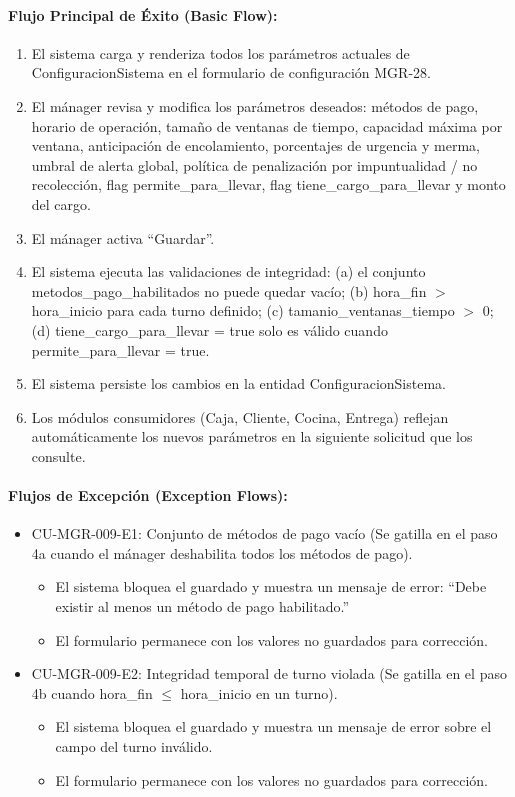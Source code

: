\paragraph{Flujo Principal de Éxito (Basic Flow):}
\begin{enumerate}
    \item[I.] El sistema carga y renderiza todos los parámetros actuales de ConfiguracionSistema en el formulario de configuración MGR-28.
    \item[II.] El mánager revisa y modifica los parámetros deseados: métodos de pago, horario de operación, tamaño de ventanas de tiempo, capacidad máxima por ventana, anticipación de encolamiento, porcentajes de urgencia y merma, umbral de alerta global, política de penalización por impuntualidad / no recolección, flag permite\_para\_llevar, flag tiene\_cargo\_para\_llevar y monto del cargo.
    \item[III.] El mánager activa ``Guardar''.
    \item[IV.] El sistema ejecuta las validaciones de integridad: (a) el conjunto metodos\_pago\_habilitados no puede quedar vacío; (b) hora\_fin $>$ hora\_inicio para cada turno definido; (c) tamanio\_ventanas\_tiempo $>$ 0; (d) tiene\_cargo\_para\_llevar = true solo es válido cuando permite\_para\_llevar = true.
    \item[V.] El sistema persiste los cambios en la entidad ConfiguracionSistema.
    \item[VI.] Los módulos consumidores (Caja, Cliente, Cocina, Entrega) reflejan automáticamente los nuevos parámetros en la siguiente solicitud que los consulte.
\end{enumerate}

\paragraph{Flujos de Excepción (Exception Flows):}
\begin{itemize}
    \item CU-MGR-009-E1: Conjunto de métodos de pago vacío (Se gatilla en el paso 4a cuando el mánager deshabilita todos los métodos de pago).
    \begin{itemize}
        \item El sistema bloquea el guardado y muestra un mensaje de error: ``Debe existir al menos un método de pago habilitado.''
        \item El formulario permanece con los valores no guardados para corrección.
    \end{itemize}
    \item CU-MGR-009-E2: Integridad temporal de turno violada (Se gatilla en el paso 4b cuando hora\_fin $\le$ hora\_inicio en un turno).
    \begin{itemize}
        \item El sistema bloquea el guardado y muestra un mensaje de error sobre el campo del turno inválido.
        \item El formulario permanece con los valores no guardados para corrección.
    \end{itemize}
\end{itemize}

